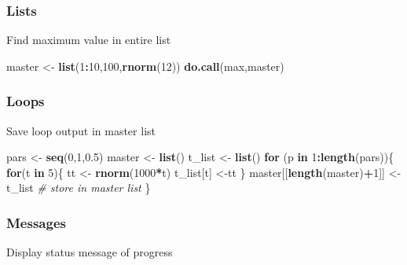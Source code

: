 \documentclass[10,portrait]{article}
\newenvironment{Shaded}{\begin{snugshade}}{\end{snugshade}}
\newcommand{\KeywordTok}[1]{\textcolor[rgb]{0.13,0.29,0.53}{\textbf{#1}}}
\newcommand{\DecValTok}[1]{\textcolor[rgb]{0.00,0.00,0.81}{#1}}
\newcommand{\FloatTok}[1]{\textcolor[rgb]{0.00,0.00,0.81}{#1}}
\newcommand{\StringTok}[1]{\textcolor[rgb]{0.31,0.60,0.02}{#1}}
\newcommand{\CommentTok}[1]{\textcolor[rgb]{0.56,0.35,0.01}{\textit{#1}}}
\newcommand{\ControlFlowTok}[1]{\textcolor[rgb]{0.13,0.29,0.53}{\textbf{#1}}}
\newcommand{\OperatorTok}[1]{\textcolor[rgb]{0.81,0.36,0.00}{\textbf{#1}}}
\newcommand{\NormalTok}[1]{#1}
\begin{document}
\subsubsection{Lists}\label{lists}

Find maximum value in entire list

\begin{Shaded}
\begin{Highlighting}[]
\NormalTok{master <-}\StringTok{ }\KeywordTok{list}\NormalTok{(}\DecValTok{1}\OperatorTok{:}\DecValTok{10}\NormalTok{,}\DecValTok{100}\NormalTok{,}\KeywordTok{rnorm}\NormalTok{(}\DecValTok{12}\NormalTok{))}
\KeywordTok{do.call}\NormalTok{(max,master)}
\end{Highlighting}
\end{Shaded}

\subsubsection{Loops}\label{loops}

Save loop output in master list

\begin{Shaded}
\begin{Highlighting}[]
\NormalTok{pars <-}\StringTok{ }\KeywordTok{seq}\NormalTok{(}\DecValTok{0}\NormalTok{,}\DecValTok{1}\NormalTok{,}\FloatTok{0.5}\NormalTok{)}
\NormalTok{master <-}\StringTok{ }\KeywordTok{list}\NormalTok{()}
\NormalTok{t_list <-}\StringTok{ }\KeywordTok{list}\NormalTok{()}
\ControlFlowTok{for}\NormalTok{ (p }\ControlFlowTok{in} \DecValTok{1}\OperatorTok{:}\KeywordTok{length}\NormalTok{(pars))\{}
  \ControlFlowTok{for}\NormalTok{(t }\ControlFlowTok{in} \DecValTok{5}\NormalTok{)\{}
\NormalTok{    tt <-}\StringTok{ }\KeywordTok{rnorm}\NormalTok{(}\DecValTok{1000}\OperatorTok{*}\NormalTok{t)}
\NormalTok{    t_list[t] <-tt }
\NormalTok{  \}}
\NormalTok{  master[[}\KeywordTok{length}\NormalTok{(master)}\OperatorTok{+}\DecValTok{1}\NormalTok{]] <-}\StringTok{ }\NormalTok{t_list }\CommentTok{# store in master list}
\NormalTok{\} }
\end{Highlighting}
\end{Shaded}

\subsubsection{Messages}\label{messages}

Display status message of progress
\end{document}

